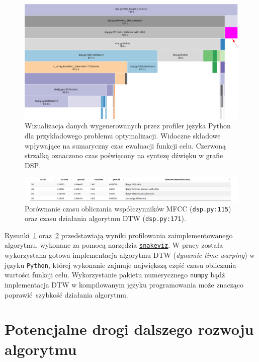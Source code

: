 \begin{figure}[H]
    \centering
    \includegraphics[width=1.0\linewidth]{rys07/profile_target_function_execution.png}
    \caption{
      Wizualizacja danych wygenerowanych przez profiler języka Python
      dla przykładowego problemu optymalizacji. Widoczne składowe wpływające
      na sumaryczny czas ewaluacji funkcji celu.
      Czerwoną strzałką oznaczono czas poświęcony
      na syntezę dźwięku w grafie DSP\@.
    }\label{fig:target_function_profiling}
\end{figure}

\begin{figure}[H]
    \centering
    \includegraphics[width=1.0\linewidth]{rys07/mfcc_search.png}
    \caption{
      Porównanie czasu obliczania współczynników MFCC (\texttt{dsp.py:115})
      oraz czasu działania algorytmu DTW (\texttt{dsp.py:171}).
    }\label{fig:mfcc_profiling}
\end{figure}

Rysunki~\ref{fig:target_function_profiling} oraz~\ref{fig:mfcc_profiling}
przedstawiają wyniki profilowania zaimplementowanego algorytmu, wykonane
za pomocą narzędzia \href{https://jiffyclub.github.io/snakeviz/}{\texttt{snakeviz}}.
W pracy została wykorzystana gotowa implementacja
algorytmu DTW (\textit{dynamic time warping}) w języku \texttt{Python}, której
wykonanie zajmuje największą część czasu obliczania wartości funkcji celu.
Wykorzystanie pakietu numerycznego \texttt{numpy} bądź implementacja DTW w
kompilowanym języku programowania może znacząco poprawić szybkość działania algorytmu.

\section{Potencjalne drogi dalszego rozwoju algorytmu}\label{sec:potential_improvements}

